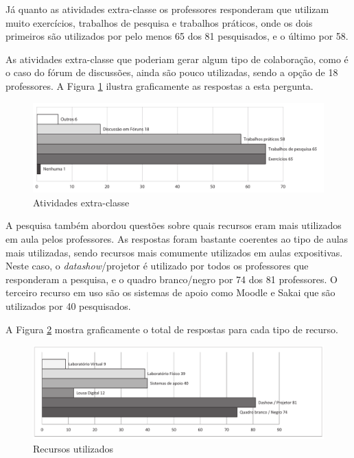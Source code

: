 Já quanto as atividades extra-classe os professores responderam que utilizam muito exercícios, trabalhos de pesquisa e trabalhos práticos, onde os dois primeiros são utilizados por pelo menos 65 dos 81 pesquisados, e o último por 58. 

As atividades extra-classe que poderiam gerar algum tipo de colaboração, como é o caso do fórum de discussões, ainda são pouco utilizadas, sendo a opção de 18 professores. A Figura \ref{fig:grafico_atividades_extra_classe} ilustra graficamente as respostas a esta pergunta.

 
\begin{figure}[!h]
\centering
\includegraphics[width=1.0\textwidth]{pdfs/professores/img-grafico-extra-classe.pdf} 
\caption{Atividades extra-classe}
\label{fig:grafico_atividades_extra_classe} 
\end{figure}



A pesquisa também abordou questões sobre quais recursos eram mais utilizados em aula pelos professores. As respostas foram bastante coerentes ao tipo de aulas mais utilizadas, sendo recursos mais comumente utilizados em aulas expositivas. Neste caso, o \emph{datashow}/projetor é utilizado por todos os professores que responderam a pesquisa, e o quadro branco/negro por 74 dos 81 professores. O terceiro recurso em uso são os sistemas de apoio como Moodle e Sakai que são utilizados por 40 pesquisados.

A Figura \ref{fig:grafico_recursos} mostra graficamente o total de respostas para cada tipo de recurso.
 
\begin{figure}[!h]
\centering
\includegraphics[width=1.0\textwidth]{pdfs/professores/img-grafico-recursos.pdf} 
\caption{Recursos utilizados}
\label{fig:grafico_recursos} 
\end{figure}


